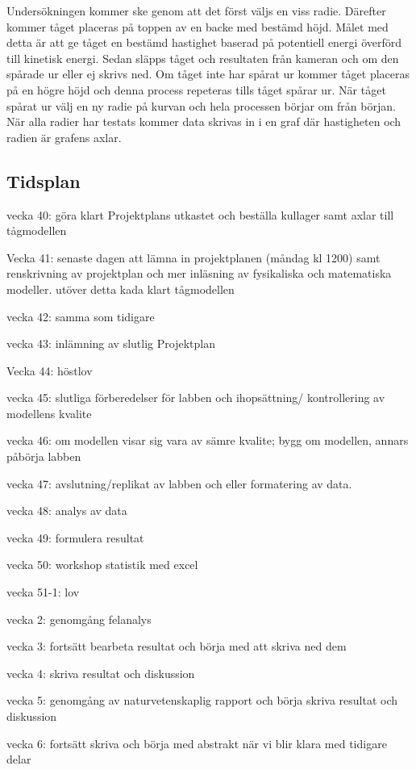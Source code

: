 Undersökningen kommer ske genom att det först väljs en viss radie. Därefter kommer tåget placeras på toppen av en backe med bestämd höjd. Målet med detta är att ge tåget en bestämd hastighet baserad på potentiell energi överförd till kinetisk energi. Sedan släpps tåget och resultaten från kameran och om den spårade ur eller ej skrivs ned. Om tåget inte har spårat ur kommer tåget placeras på en högre höjd och denna process repeteras tills tåget spårar ur. När tåget spårat ur välj en ny radie på kurvan och hela processen börjar om från början. När alla radier har testats kommer data skrivas in i en graf där hastigheten och radien är grafens axlar.



\subsection{Tidsplan}
vecka 40:
göra klart Projektplans utkastet och beställa kullager samt axlar till tågmodellen

Vecka 41: senaste dagen att lämna in projektplanen (måndag kl 1200) samt renskrivning av projektplan och mer inläsning av fysikaliska och matematiska modeller. utöver detta kada klart tågmodellen

vecka 42: samma som tidigare

vecka 43: inlämning av slutlig Projektplan

Vecka 44: höstlov

vecka 45: slutliga förberedelser för labben och ihopsättning/ kontrollering av modellens kvalite

vecka 46: om modellen visar sig vara av sämre kvalite; bygg om modellen, annars påbörja labben

vecka 47: avslutning/replikat av labben och eller formatering av data.

vecka 48: analys av data

vecka 49: formulera resultat

vecka 50: workshop statistik med excel

vecka 51-1: lov

vecka 2: genomgång felanalys

vecka 3: fortsätt bearbeta resultat och börja med att skriva ned dem

vecka 4: skriva resultat och diskussion

vecka 5: genomgång av naturvetenskaplig rapport och börja skriva resultat och diskussion

vecka 6: fortsätt skriva och börja med abstrakt när vi blir klara med tidigare delar

